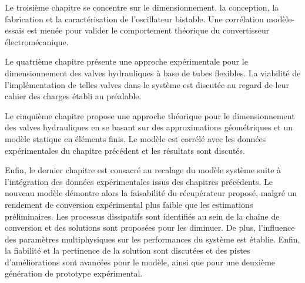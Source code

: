 Le troisième chapitre se concentre sur le dimensionnement, la conception, la fabrication et la caractérisation de l'oscillateur bistable. Une corrélation modèle-essais est menée pour valider le comportement théorique du convertisseur électromécanique.

Le quatrième chapitre présente une approche expérimentale pour le dimensionnement des valves hydrauliques à base de tubes flexibles. La viabilité de l'implémentation de telles valves dans le système est discutée au regard de leur cahier des charges établi au préalable.

Le cinquième chapitre propose une approche théorique pour le dimensionnement des valves hydrauliques en se basant sur des approximations géométriques et un modèle statique en éléments finis. Le modèle est corrélé avec les données expérimentales du chapitre précédent et les résultats sont discutés.

Enfin, le dernier chapitre est consacré au recalage du modèle système suite à l'intégration des données expérimentales issus des chapitres précédents. Le nouveau modèle démontre alors la faisabilité du récupérateur proposé, malgré un rendement de conversion expérimental plus faible que les estimations préliminaires. Les processus dissipatifs sont identifiés au sein de la chaîne de conversion et des solutions sont proposées pour les diminuer. De plus, l'influence des paramètres multiphysiques sur les performances du système est établie. Enfin, la fiabilité et la pertinence de la solution sont discutées et des pistes d'améliorations sont avancées pour le modèle, ainsi que pour une deuxième génération de prototype expérimental.


















